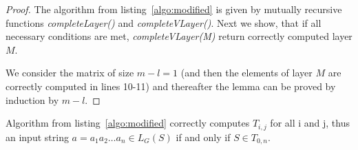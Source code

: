 \begin{proof}

The algorithm from listing~\ref{algo:modified} is given by mutually recursive functions \textit{completeLayer()} and \textit{completeVLayer()}. Next we show, that if all necessary conditions are met, \textit{completeVLayer(M)} return correctly computed layer $M$.

We consider the matrix of size $m - l = 1$ (and then the elements of layer $M$ are correctly computed in lines 10-11) and thereafter the lemma can be proved by induction by $m - l$.


\end{proof}

\begin{theorem}
Algorithm from listing~\ref{algo:modified} correctly computes $T_{i, j}$ for all i and j, thus an input string $a = a_{1}a_{2} \dots a_{n} \in L_{G}(S)$ if and only if $S \in T_{0, n}$.
\end{theorem}

